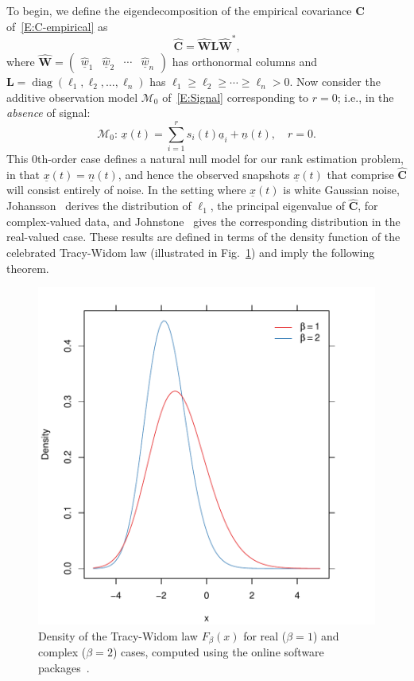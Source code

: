 \documentclass[final]{IEEEtran} %
\newcommand{\vectorsymbol}{\underline}
\newcommand{\matrixsymbol}{\boldsymbol}
\newcommand{\mhC}{\widehat{\matrixsymbol{C}}}
\newcommand{\mhW}{\widehat{\matrixsymbol{W}}}
\newcommand{\mL}{\matrixsymbol{L}}
\newcommand{\va}{\vectorsymbol{a}}
\newcommand{\vn}{\vectorsymbol{n}}
\newcommand{\vhw}{\hat{\vectorsymbol{w}}}
\newcommand{\vx}{\vectorsymbol{x}}
\DeclareMathOperator*{\diag}{diag}
\begin{document}
To begin, we define the eigendecomposition of the empirical covariance $\mhC$ of~\eqref{E:C-empirical} as
\begin{equation}\label{E:Cemp-decomp-eig}
    \mhC = \mhW \mL \mhW^* \text{,}
\end{equation}
where
\(
    \mhW
    =
    \left(
    \begin{matrix}
        \vhw_1 & \vhw_2 & \cdots & \vhw_n
    \end{matrix}
    \right)
\)
has orthonormal columns and
\(
    \mL
    =
    \diag( \ell_1, \ell_2, \ldots, \ell_n )
\)
has $\ell_1 \geq \ell_2 \geq \cdots \geq \ell_{n} > 0$.  Now consider the additive observation model $\mathcal{M}_0$ of~\eqref{E:Signal} corresponding to $r=0$; i.e., in the \emph{absence} of signal:
\begin{equation*}
    \mathcal{M}_0\!:\, \vx(t) = \sum_{i=1}^{r} s_{i}(t) \va_{i} + \vn(t), \quad r = 0 .
\end{equation*}
This $0$th-order case defines a natural null model for our rank estimation problem, in that $\vx(t) = \vn(t)$, and hence the observed snapshots $\vx(t)$ that comprise $\mhC$ will consist entirely of noise.  In the setting where $\vx(t)$ is white Gaussian noise, Johansson~\cite{johansson2000sfa} derives the distribution of $\ell_1$, the principal eigenvalue of $\mhC$, for complex-valued data, and Johnstone~\cite{johnstone2001dle} gives the corresponding distribution in the real-valued case.  These results are defined in terms of the density function of the celebrated Tracy-Widom law (illustrated in Fig.~\ref{F:tw-density}) and imply the following theorem.
\begin{figure}[t]
    \centering
    \includegraphics[width=\columnwidth]{plots/tw-density}
    \caption{\label{F:tw-density}Density of the Tracy-Widom law $F_\beta(x)$ for real ($\beta=1$) and complex ($\beta=2$) cases, computed using the online software packages~\cite{dieng2006rml, perry2009rmtstat}.
    }
\end{figure}
\end{document}
